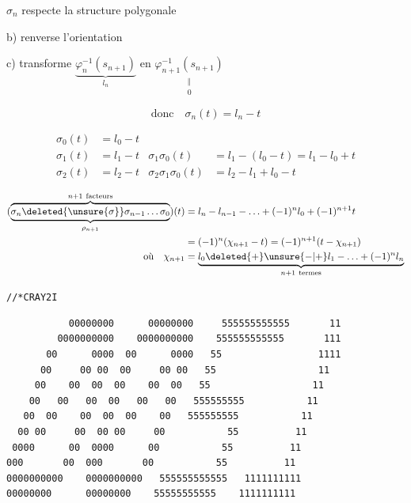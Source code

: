 

$\sigma_n$ \quad {} respecte la structure polygonale

b) renverse l'orientation

c) transforme $\underbrace{\varphi_n^{-1}(s_{n+1})}_{l_n}$ en $\underset{\substack{\Vert\\0}}{\varphi_{n+1}^{-1}(s_{n+1})}$

\[ \text{donc}\quad \sigma_n(t)=l_n-t \]

\[ \begin{aligned}
\sigma_0(t)&=l_0-t\\
\sigma_1(t)&=l_1-t &\sigma_1\sigma_0(t)&=l_1-(l_0-t)=l_1-l_0+t\\
\sigma_2(t)&=l_2-t &\sigma_2\sigma_1\sigma_0(t)&=l_2-l_1+l_0-t
\end{aligned} \]

\[ \begin{aligned}
(\underbrace{\overbrace{\sigma_n\deleted{\unsure{\sigma}}\sigma_{n-1}\ldots\sigma_0}^{n+1\ \text{facteurs}}}_{\rho_{n+1}})(t)&=l_n-l_{n-1}-\ldots+(-1)^n l_0+(-1)^{n+1}t\\
&=(-1)^n(\chi_{n+1}-t)=(-1)^{n+1}(t-\chi_{n+1})\\
\text{où}\quad \chi_{n+1}&=\underbrace{l_0\deleted{+}\unsure{-|+}l_1-\ldots+(-1)^n l_n}_{n+1\ \text{termes}}
\end{aligned} \]


\texttt{//*\quad CRAY2\qquad I}

{\scriptsize
\begin{verbatim}
           00000000      00000000     555555555555       11
         0000000000    0000000000    555555555555       111
       00      0000  00      0000   55                 1111
      00     00 00  00     00 00   55                  11
     00    00  00  00    00  00   55                  11
    00   00   00  00   00   00   555555555           11
   00  00    00  00  00    00   555555555           11
  00 00     00  00 00     00           55          11
 0000      00  0000      00           55          11
000       00  000       00           55          11
0000000000    0000000000   555555555555   1111111111
00000000      00000000    55555555555    1111111111
\end{verbatim}
}

